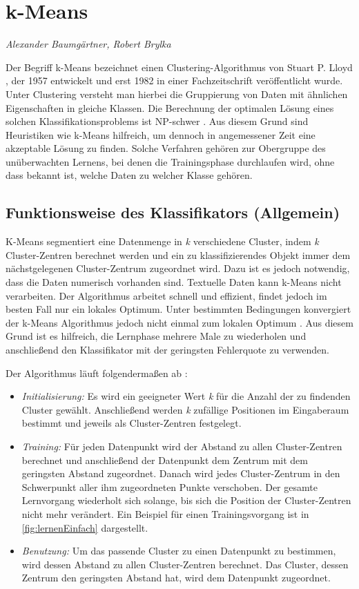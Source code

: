 \section{k-Means}
\label{mainsec:kmeans}
\textit{Alexander Baumgärtner, Robert Brylka}

Der Begriff k-Means bezeichnet einen Clustering-Algorithmus von Stuart P. Lloyd \cite{Lloyd}, der 1957 entwickelt und erst 1982 in einer Fachzeitschrift veröffentlicht wurde. Unter Clustering versteht man hierbei die Gruppierung von Daten mit ähnlichen Eigenschaften in gleiche Klassen. Die Berechnung der optimalen Lösung eines solchen Klassifikationsproblems ist NP-schwer \cite{kMeansNPhard}. Aus diesem Grund sind Heuristiken wie k-Means hilfreich, um dennoch in angemessener Zeit eine akzeptable Lösung zu finden.
Solche Verfahren gehören zur Obergruppe des unüberwachten Lernens, bei denen die Trainingsphase durchlaufen wird, ohne dass 
bekannt ist, welche Daten zu welcher Klasse gehören.

\subsection{Funktionsweise des Klassifikators (Allgemein)} \label{subsec:kMeansFunktionsweise}
K-Means segmentiert eine Datenmenge in \emph{k} verschiedene Cluster, indem \emph{k} Cluster-Zentren berechnet werden und ein zu klassifizierendes Objekt immer dem nächstgelegenen Cluster-Zentrum zugeordnet wird. Dazu ist es jedoch notwendig, dass die Daten numerisch vorhanden sind. Textuelle Daten kann k-Means nicht verarbeiten.
Der Algorithmus arbeitet schnell und effizient, findet jedoch im besten Fall nur ein lokales Optimum. Unter bestimmten Bedingungen konvergiert der k-Means Algorithmus jedoch nicht einmal zum lokalen Optimum \cite{kMeansMinimum}. Aus diesem Grund ist es hilfreich, die Lernphase mehrere Male zu wiederholen und anschließend den Klassifikator mit der geringsten Fehlerquote zu verwenden.  

Der Algorithmus läuft folgendermaßen ab \cite{Marsland}:
\begin{itemize}

\item \emph{Initialisierung:} Es wird ein geeigneter Wert \emph{k} für die Anzahl der zu findenden Cluster gewählt.
Anschließend werden \emph{k} zufällige Positionen im Eingaberaum bestimmt und jeweils als Cluster-Zentren festgelegt.
\item \emph{Training:} Für jeden Datenpunkt wird der Abstand zu allen Cluster-Zentren berechnet und anschließend der Datenpunkt dem Zentrum mit dem geringsten Abstand zugeordnet. 
Danach wird jedes Cluster-Zentrum in den Schwerpunkt aller ihm zugeordneten Punkte verschoben.
Der gesamte Lernvorgang wiederholt sich solange, bis sich die Position der Cluster-Zentren nicht mehr verändert. 
Ein Beispiel für einen Trainingsvorgang ist in \autoref{fig:lernenEinfach} dargestellt.
\item \emph{Benutzung:} Um das passende Cluster zu einen Datenpunkt zu bestimmen, wird dessen Abstand zu allen Cluster-Zentren berechnet. Das Cluster, dessen Zentrum den geringsten Abstand hat, wird dem Datenpunkt zugeordnet.
\end{itemize}


